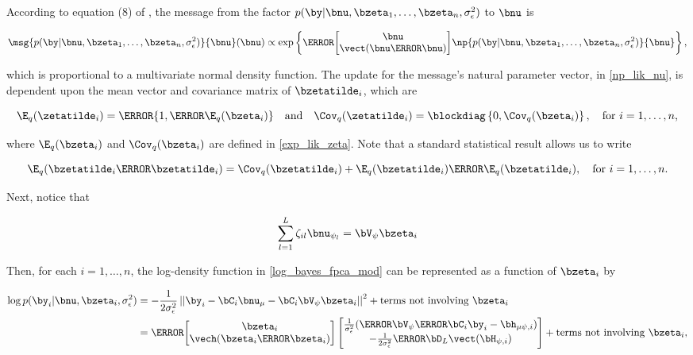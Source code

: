 \documentclass[12pt]{article}
\theoremstyle{plain}
\theoremstyle{definition}
\theoremstyle{remark}
\def\sigsqeps{\sigma^2_{\epsilon}}
\def\numu{\bnu_\mu}
\def\Vpsi{\bV_\psi}
\newcommand\nupsi[1]{\bnu_{\psi_{#1}}}
\newcommand\hmupsi[1]{\bh_{\mu \psi, #1}}
\newcommand\Hpsi[1]{\bH_{\psi, #1}}
\newcommand\tni[1]{\text{terms not involving $#1$}}
\begin{document}
\noindent According to equation (8) of \citet{wand17}, the message from the factor $p (\by | \bnu,
\bzeta_1, \dots, \bzeta_n, \sigsqeps)$ to $\bnu$ is

\[
	\msg{p (\by | \bnu, \bzeta_1, \dots, \bzeta_n, \sigsqeps)}{\bnu} (\bnu) \propto
		\exp \left\{
			\T{\begin{bmatrix}
				\bnu \\
				\vect (\bnu \T{\bnu})
			\end{bmatrix}}
			\np{p (\by | \bnu, \bzeta_1, \dots, \bzeta_n, \sigsqeps)}{\bnu}
		\right\},
\]

\noindent which is proportional to a
multivariate normal density function. The update for the message's natural parameter vector,
in \eqref{np_lik_nu}, is dependent upon
the mean vector and covariance matrix of $\bzetatilde_i$, which are

\begin{equation}
	\E_q (\zetatilde_i) = \T{\{ 1, \T{\E_q (\bzeta_i)} \}} \quad
	\text{and} \quad
	\Cov_q (\zetatilde_i) = \blockdiag \left\{ 0, \Cov_q (\bzeta_i) \right\}, \quad
	\text{for $i = 1, \dots, n$,}
\label{exp_lik_zeta_tilde}
\end{equation}

\noindent where $\E_q (\bzeta_i)$ and $\Cov_q (\bzeta_i)$ are defined in \eqref{exp_lik_zeta}. Note that
a standard statistical result allows us to write

\begin{equation}
	\E_q (\bzetatilde_i \T{\bzetatilde_i}) =
		\Cov_q (\bzetatilde_i) + \E_q (\bzetatilde_i) \T{\E_q (\bzetatilde_i)}, \quad \text{for $i = 1, \dots, n$.}
\label{E_q_outer_zeta}
\end{equation}

Next, notice that

\begin{equation}
	\sum_{l=1}^L \zeta_{il} \nupsi{l} = \Vpsi \bzeta_i
\label{zeta_simplification}
\end{equation}

\noindent Then, for each $i = 1, \dots, n$, the log-density function
in \eqref{log_bayes_fpca_mod} can be represented as a function of $\bzeta_i$ by

\begin{align*}
	\log p (\by_i | \bnu, \bzeta_i, \sigsqeps)
		& = -\frac{1}{2\sigsqeps} \left|\left|
			\by_i - \bC_i \numu - \bC_i \Vpsi \bzeta_i
		\right|\right|^2 + \tni{\bzeta_i} \\
		& = \T{
			\begin{bmatrix}
				\bzeta_i \\
				\vech (\bzeta_i \T{\bzeta_i})
			\end{bmatrix}
		} \begin{bmatrix}
			\frac{1}{\sigsqeps} (\T{\Vpsi} \T{\bC_i} \by_i - \hmupsi{i}) \\
			-\frac{1}{2 \sigsqeps} \T{\bD_L} \vect (\Hpsi{i})
		\end{bmatrix} + \tni{\bzeta_i},
\end{align*}
\end{document}
